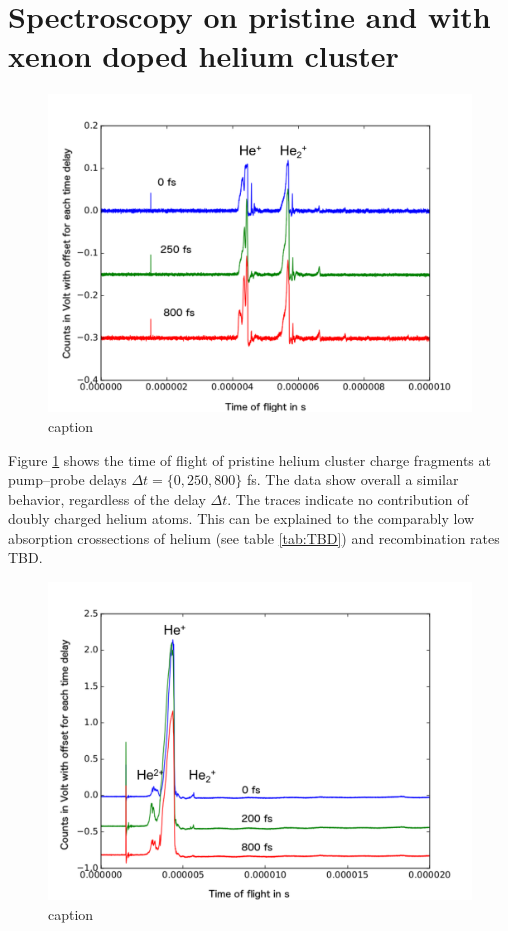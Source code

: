 \section{Spectroscopy on pristine and with xenon doped helium cluster}
\begin{figure}
	\centering
		\includegraphics[width=1.00\textwidth]{images/results/TOF-helium-cluster.png}
	\caption{caption}
	\label{fig:TOF-helium-cluster}
\end{figure}
Figure \ref{fig:TOF-helium-cluster} shows the time of flight of pristine helium cluster charge fragments at pump--probe delays $\Delta t=\{0, 250, 800\}$ fs. The data show overall a similar behavior, regardless of the delay $\Delta t$. The traces indicate no contribution of doubly charged helium atoms. This can be explained to the comparably low absorption crossections of helium (see table \ref{tab:TBD}) and recombination rates TBD.\\
\begin{figure}
	\centering{}
		\includegraphics[width=1.00\textwidth]{images/results/TOF-helium-xenon-cluster-60.png}
	\caption{caption}
	\label{fig:TOF-helium-xenon-cluster-60}
\end{figure}
